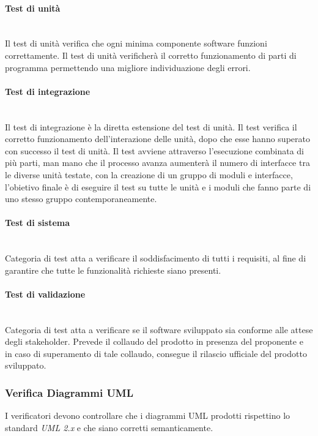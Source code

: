 \paragraph{Test di unità} \-\\
Il test di unità verifica che ogni minima componente software funzioni correttamente. Il test di unità verificherà il corretto funzionamento di parti di programma permettendo una migliore individuazione degli errori.

\paragraph{Test di integrazione}\-\\
Il test di integrazione è la diretta estensione del test di unità. Il test verifica il corretto funzionamento dell'interazione delle unità, dopo che esse hanno superato con successo il test di unità. Il test avviene attraverso l'esecuzione combinata di più parti, man mano che il processo avanza aumenterà il numero di interfacce tra le diverse unità testate, con la creazione di un gruppo di moduli e interfacce, l'obietivo finale è di eseguire il test su tutte le unità e i moduli che fanno parte di uno stesso gruppo contemporaneamente.


\paragraph{Test di sistema}\-\\
Categoria di test atta a verificare il soddisfacimento di tutti i requisiti, al fine di garantire che tutte le funzionalità richieste siano presenti.

\paragraph{Test di validazione} \-\\
Categoria di test atta a verificare se il software sviluppato sia conforme alle attese degli stakeholder.  Prevede il collaudo del prodotto in presenza del proponente e in caso di superamento di tale collaudo, consegue il rilascio ufficiale del prodotto sviluppato.

\subsubsection{Verifica Diagrammi UML}
I verificatori devono controllare che i diagrammi UML prodotti rispettino lo standard \textit{UML 2.x} e che siano corretti semanticamente.

